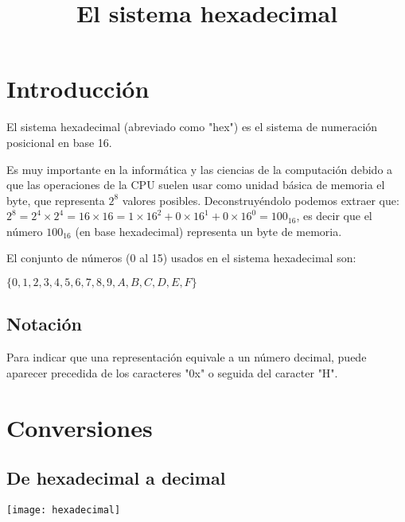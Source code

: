 \documentclass{article}
\title{El sistema hexadecimal}
\author{}
\date{}
\begin{document}
\maketitle
\thispagestyle{empty}  %

\section{Introducción}
El sistema hexadecimal (abreviado como "hex") es el sistema de numeración posicional en base 16.

Es muy importante en la informática y las ciencias de la computación debido a que las operaciones de la CPU suelen usar como unidad básica de memoria el byte, que representa $2^8$ valores posibles. Deconstruyéndolo podemos extraer que: $2^8 = 2^4 \times 2^4 = 16 \times 16 = 1 \times 16^2 + 0 \times 16^1 + 0 \times 16^0 = 100_{16}$, es decir que el número $100_{16}$ (en base hexadecimal) representa un byte de memoria.

El conjunto de números (0 al 15) usados en el sistema hexadecimal son:
\begin{center}
$\{0,1,2,3,4,5,6,7,8,9,A,B,C,D,E,F\}$
\end{center}

\subsection{Notación}
Para indicar que una representación equivale a un número decimal, puede aparecer precedida de los caracteres "0x" o seguida del caracter "H".

\section{Conversiones}
\subsection{De hexadecimal a decimal}
\texttt{[image: hexadecimal]}
\end{document}
